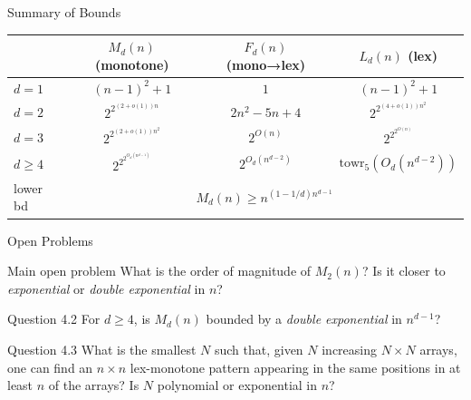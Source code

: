 \begin{frame}{Summary of Bounds}
  \renewcommand{\arraystretch}{1.4}
  \begin{center}
    \begin{tabular}{lccc}
      \toprule
      & \( M_d(n) \) (monotone) & \( F_d(n) \) (mono→lex) & \( L_d(n) \) (lex) \\
      \midrule
      \( d=1 \) & \( (n-1)^2+1 \) & \( 1 \) & \( (n-1)^2+1 \) \\
      \( d=2 \) & \( 2^{2^{(2+o(1))n}} \) & \( 2n^2-5n+4 \) & \( 2^{2^{(4+o(1))n^2}} \) \\
      \( d=3 \) & \( 2^{2^{(2+o(1))n^2}} \) & \( 2^{O(n)} \) & \( 2^{2^{2^{O(n)}}} \) \\
      \( d \geq 4 \) & \( 2^{2^{2^{O_d(n^{d-1})}}} \) & \( 2^{O_d(n^{d-2})} \) & \( \text{towr}_5(O_d(n^{d-2})) \) \\
      \midrule
      lower bd & \multicolumn{3}{c}{\( M_d(n) \geq n^{(1-1/d)n^{d-1}} \)} \\
      \bottomrule
    \end{tabular}
  \end{center}
\end{frame}

\begin{frame}{Open Problems}
  \begin{ffact}{Main open problem}
    What is the order of magnitude of \( M_2(n) \)?
    Is it closer to \emph{exponential} or \emph{double exponential} in \( n \)?
  \end{ffact}
\pause
  \begin{ffact}{Question 4.2}
    For \( d \geq 4 \), is \( M_d(n) \) bounded by a \emph{double exponential}
    in \( n^{d-1} \)?
  \end{ffact}
\pause
  \begin{ffact}{Question 4.3}
    What is the smallest \( N \) such that, given \( N \) increasing \( N \times N \)
    arrays, one can find an \( n \times n \) lex-monotone pattern appearing in the
    same positions in at least \( n \) of the arrays?
    Is \( N \) polynomial or exponential in \( n \)?
  \end{ffact}
\end{frame}


